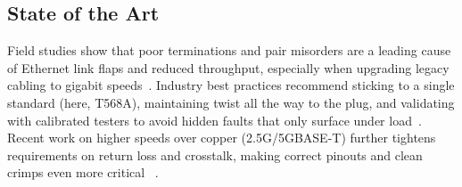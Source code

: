 \subsection{State of the Art}
Field studies show that poor terminations and pair misorders are a leading
cause of Ethernet link flaps and reduced throughput, especially when upgrading
legacy cabling to gigabit speeds~\cite{biegel2006}. Industry best practices
recommend sticking to a single standard (here, T568A), maintaining twist all
the way to the plug, and validating with calibrated testers to avoid hidden
faults that only surface under load~\cite{fluketest}. Recent work on higher
speeds over copper (2.5G/5GBASE-T) further tightens requirements on return loss
and crosstalk, making correct pinouts and clean crimps even more critical
~\cite{ieee8023bz}.
